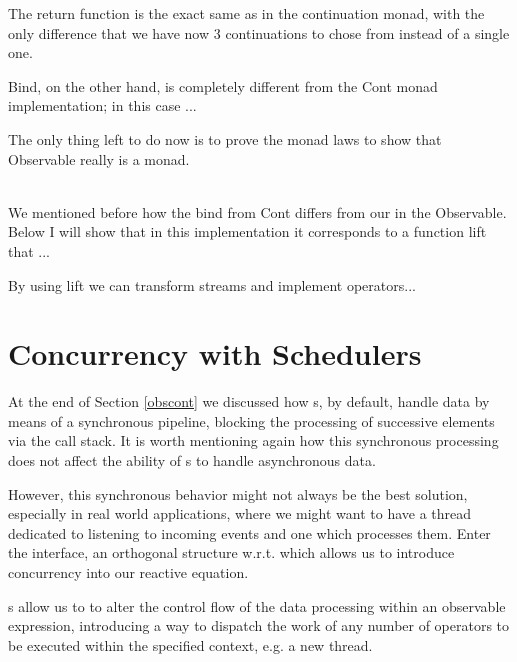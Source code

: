 The return function is the exact same as in the continuation monad, with the only difference that we have now 3 continuations to chose from instead of a single one. 

Bind, on the other hand, is completely different from the Cont monad implementation; in this case ... 

The only thing left to do now is to prove the monad laws to show that Observable really is a monad.

\\

We mentioned before how the bind from Cont differs from our in the Observable. Below I will show that in this implementation it corresponds to a function lift that ... 

By using lift we can transform streams and implement operators...



\section{Concurrency with Schedulers}

At the end of Section \ref{obscont} we discussed how s, by default, handle data by means of a synchronous pipeline, blocking the processing of successive elements via the call stack. It is worth mentioning again how this synchronous processing does not affect the ability of s to handle asynchronous data.

However, this synchronous behavior might not always be the best solution, especially in real world applications, where we might want to have a thread dedicated to listening to incoming events and one which processes them. Enter the  interface, an orthogonal\cite{wiki:orthogonality} structure w.r.t.  which allows us to introduce concurrency into our reactive equation. 

s allow us to to alter the control flow of the data processing within an observable expression, introducing a way to dispatch the work of any number of operators to be executed within the specified context, e.g. a new thread.

